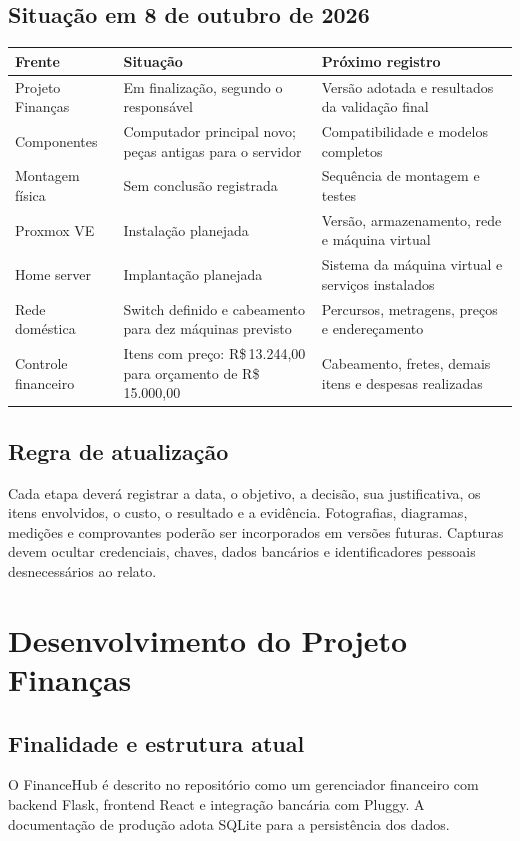 \documentclass[11pt,a4paper,oneside]{report}
\newcommand{\dinheiro}[1]{R\$\,#1}
\newcommand{\datarelatorio}{8 de outubro de 2026}
\begin{document}
\section{Situação em \datarelatorio}
\begin{tabularx}{\textwidth}{@{}p{4.1cm}YY@{}}
\toprule
Frente & Situação & Próximo registro \\
\midrule
Projeto Finanças & Em finalização, segundo o responsável & Versão adotada e resultados da validação final \\
Componentes & Computador principal novo; peças antigas para o servidor & Compatibilidade e modelos completos \\
Montagem física & Sem conclusão registrada & Sequência de montagem e testes \\
Proxmox VE & Instalação planejada & Versão, armazenamento, rede e máquina virtual \\
Home server & Implantação planejada & Sistema da máquina virtual e serviços instalados \\
Rede doméstica & Switch definido e cabeamento para dez máquinas previsto & Percursos, metragens, preços e endereçamento \\
Controle financeiro & Itens com preço: \dinheiro{13.244,00} para orçamento de \dinheiro{15.000,00} & Cabeamento, fretes, demais itens e despesas realizadas \\
\bottomrule
\end{tabularx}

\section{Regra de atualização}
Cada etapa deverá registrar a data, o objetivo, a decisão, sua justificativa,
os itens envolvidos, o custo, o resultado e a evidência. Fotografias, diagramas,
medições e comprovantes poderão ser incorporados em versões futuras.
Capturas devem ocultar credenciais, chaves, dados bancários e identificadores
pessoais desnecessários ao relato.

\chapter{Desenvolvimento do Projeto Finanças}
\section{Finalidade e estrutura atual}
O FinanceHub é descrito no repositório como um gerenciador financeiro com
backend Flask, frontend React e integração bancária com Pluggy. A documentação
de produção adota SQLite para a persistência dos dados.
\end{document}
